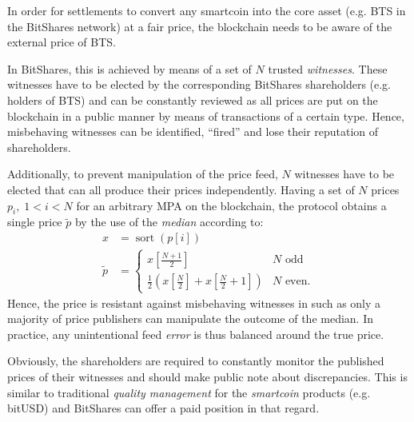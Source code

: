 \label{sec:feeds}

In order for settlements to convert any smartcoin into the core asset (e.g. BTS
in the BitShares network) at a fair price, the blockchain needs to be aware of
the external price of BTS.

In BitShares, this is achieved by means of a set of $N$ trusted
\emph{witnesses}. These witnesses have to be elected by the corresponding
BitShares shareholders (e.g. holders of BTS) and can be constantly reviewed as
all prices are put on the blockchain in a public manner by means of
transactions of a certain type. Hence, misbehaving witnesses can be identified,
``fired'' and lose their reputation of shareholders.

Additionally, to prevent manipulation of the price feed, $N$ witnesses have to
be elected that can all produce their prices independently. Having a set of $N$
prices $p_i,\;1<i<N$ for an arbitrary MPA on the blockchain, the protocol
obtains a single price $\tilde{p}$ by the use of the \emph{median} according
to:
\begin{align}
 x &= \operatorname{sort}(p[i])\\
 \tilde p &=\begin{cases}
   x[\frac{N+1}{2}]                                               & N \text{ odd}\\
   \frac {1}{2}\left(x[{\frac{N}{2}}] + x[\frac{N}{2} + 1]\right) & N \text{ even.}
 \end{cases}
\end{align}
Hence, the price is resistant against misbehaving witnesses in such as only a
majority of price publishers can manipulate the outcome of the median. In
practice, any unintentional feed \emph{error} is thus balanced around the true
price. %

Obviously, the shareholders are required to constantly monitor the published
prices of their witnesses and should make public note about discrepancies. This
is similar to traditional \emph{quality management} for the \emph{smartcoin}
products (e.g. bitUSD) and BitShares can offer a paid position in that regard.
